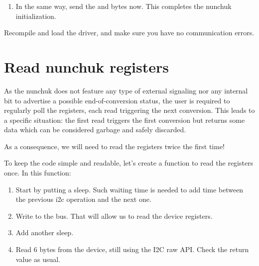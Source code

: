 \begin{enumerate}
{      As a going further task, you can use Elixir to find the right C headers to
      include if you wanted to use a function like  directly. The
      Elixir results may be a bit confusing here, because  is
      defined in  files, and not
      in  that would normally be the canonical
      place. However, look at  and you will see
      that it includes  which corresponds to the
      specific headers for the current architecture. So you would indeed need to
      include  anyway!

      {\bf General rule}: whenever the symbol you're looking
      for is defined in , you
      should include  in your kernel code.
      }

\item In the same way, send the  and  bytes now.
      This completes the nunchuk initialization.
\end{enumerate}

Recompile and load the driver, and make sure you have no communication
errors.

\section{Read nunchuk registers}

As the nunchuk does not feature any type of external signaling nor any
internal bit to advertise a possible end-of-conversion status, the user
is required to regularly poll the registers, each read triggering the
next conversion. This leads to a specific situation: the first read
triggers the first conversion but returns some data which can be
considered garbage and safely discarded.

As a consequence, we will need to read the registers twice the first time!

To keep the code simple and readable, let's create a
 function to read the registers once.
In this function:

\begin{enumerate}
\item Start by putting a  sleep. Such waiting time is
      needed to add time between the previous i2c operation and the next one.
\item Write  to the bus. That will allow us to read
      the device registers.
\item Add another  sleep.
\item Read 6 bytes from the device, still using the I2C raw API.
      Check the return value as usual.
\end{enumerate}

